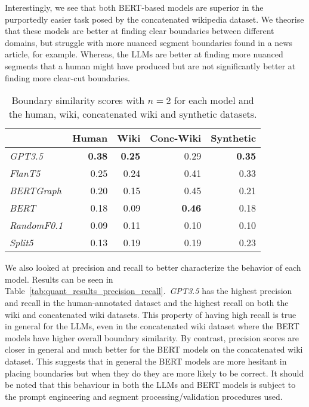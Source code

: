 Interestingly, we see that both BERT-based models are superior in the purportedly easier task posed by the concatenated wikipedia dataset. We theorise that these models are better at finding clear boundaries between different domains, but struggle with more nuanced segment boundaries found in a news article, for example. Whereas, the LLMs are better at finding more nuanced segments that a human might have produced but are not significantly better at finding more clear-cut boundaries.

\begin{table}[ht]
    \centering
    \begin{tabular}{@{}lrrrr@{}}
    \toprule
    & Human & Wiki & Conc-Wiki & Synthetic \\ \midrule
    \it GPT3.5  & \bf 0.38 & \bf 0.25 & 0.29 & \bf 0.35 \\ 
    \it FlanT5  & 0.25 & 0.24 & 0.41 & 0.33 \\ 
    \midrule
    \it BERTGraph & 0.20 & 0.15 & 0.45 & 0.21 \\ 
    \it BERT & 0.18 & 0.09 & \bf 0.46 & 0.18 \\
    \it RandomF0.1& 0.09 & 0.11 & 0.10 & 0.10 \\
    \it Split5 & 0.13 & 0.19 & 0.19 & 0.23 \\
    \bottomrule
    \end{tabular}
    \caption{Boundary similarity scores with $n=2$ for each model and the human, wiki, concatenated wiki and synthetic datasets.}\label{tab:quant_results}
\end{table}

We also looked at precision and recall to better characterize the behavior of each model. Results can be seen in Table~\ref{tab:quant_results_precision_recall}.\ \emph{GPT3.5} has the highest precision and recall in the human-annotated dataset and the highest recall on both the wiki and concatenated wiki datasets. This property of having high recall is true in general for the LLMs, even in the concatenated wiki dataset where the BERT models have higher overall boundary similarity. By contrast, precision scores are closer in general and much better for the BERT models on the concatenated wiki dataset. This suggests that in general the BERT models are more hesitant in placing boundaries but when they do they are more likely to be correct. It should be noted that this behaviour in both the LLMs and BERT models is subject to the prompt engineering and segment processing/validation procedures used.

